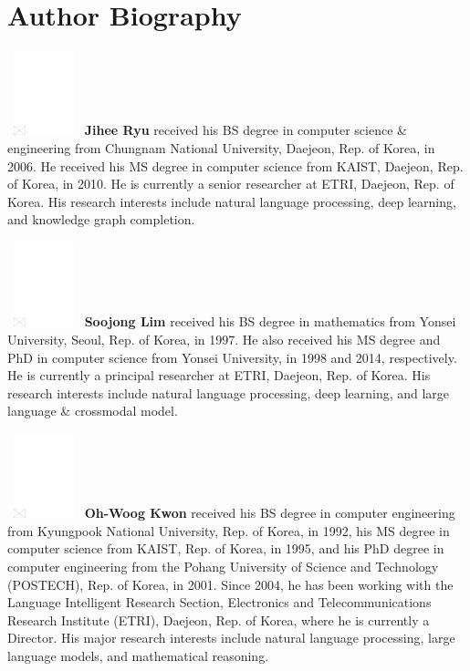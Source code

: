 \documentclass[AMS,STIX2COL]{WileyNJD-v2}
\begin{document}
    


    \section*{Author Biography}

    \begin{biography}
    {\includegraphics[width=60pt,height=70pt,draft]{empty}}
    {\textbf{Jihee Ryu} received his BS degree in computer science \& engineering from Chungnam National University, Daejeon, Rep. of Korea, in 2006. He received his MS degree in computer science from KAIST, Daejeon, Rep. of Korea, in 2010. He is currently a senior researcher at ETRI, Daejeon, Rep. of Korea. His research interests include natural language processing, deep learning, and knowledge graph completion.}
    \end{biography}

    \begin{biography}
    {\includegraphics[width=60pt,height=70pt,draft]{empty}}
    {\textbf{Soojong Lim} received his BS degree in mathematics from Yonsei University, Seoul, Rep. of Korea, in 1997. He also received his MS degree and PhD in computer science from Yonsei University, in 1998 and 2014, respectively. He is currently a principal researcher at ETRI, Daejeon, Rep. of Korea. His research interests include natural language processing, deep learning, and large language \& crossmodal model.}
    \end{biography}

    \begin{biography}
    {\includegraphics[width=60pt,height=70pt,draft]{empty}}
    {\textbf{Oh-Woog Kwon} received his BS degree in computer engineering from Kyungpook National University, Rep. of Korea, in 1992, his MS degree in computer science from KAIST, Rep. of Korea, in 1995, and his PhD degree in computer engineering from the Pohang University of Science and Technology (POSTECH), Rep. of Korea, in 2001. Since 2004, he has been working with the Language Intelligent Research Section, Electronics and Telecommunications Research Institute (ETRI), Daejeon, Rep. of Korea, where he is currently a Director. His major research interests include natural language processing, large language models, and mathematical reasoning.}
    \end{biography}
\end{document}
